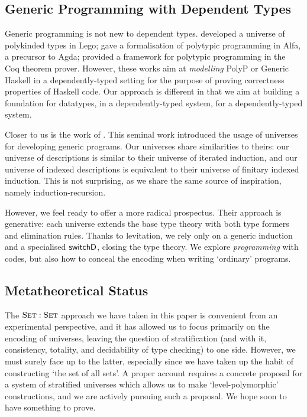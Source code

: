 \subsection{Generic Programming with Dependent Types}

Generic programming is not new to dependent
types. \citet{DBLP:conf/ifip2-1/AltenkirchM02} developed a universe
of polykinded types in Lego;
\citet{norell:msc-thesis} gave a formalisation of
polytypic programming in Alfa, a precursor to Agda;
\citet{verbruggen:polytype-prog-coq, verbruggen:polytype-coq} provided
a framework for polytypic programming in the Coq theorem
prover. However, these works aim at \emph{modelling} PolyP or Generic
Haskell in a dependently-typed setting for the purpose of proving
correctness properties of Haskell code. Our approach is different in
that we aim at building a foundation for datatypes, in a
dependently-typed system, for a dependently-typed system.

Closer to us is the work of \citet{benke:universe-generic-prog}. This
seminal work introduced the usage of universes for developing generic
programs. Our universes share similarities to theirs: our universe of
descriptions is similar to their universe of iterated induction, and
our universe of indexed descriptions is equivalent to their universe
of finitary indexed induction. This is not surprising, as we share the
same source of inspiration, namely induction-recursion.

However, we feel ready to offer a more radical prospectus. Their
approach is generative: each universe extends the base type theory
with both type formers and elimination rules. Thanks to levitation, we
rely only on a generic induction and a specialised $\SYMBswitchD$,
closing the type theory. We explore \emph{programming} with codes, but
also how to conceal the encoding when writing `ordinary' programs.


\subsection{Metatheoretical Status}

The \(\Set:\Set\) approach we have taken in this paper is convenient
from an experimental perspective, and it has allowed us to focus
primarily on the encoding of universes, leaving the question
of stratification (and with it, consistency, totality,
and decidability of type checking) to one side. However, we must
surely face up to the latter, especially since we have taken up the
habit of constructing `the set of all sets'. A proper account requires
a concrete proposal for a system of stratified universes which allows
us to make `level-polymorphic' constructions, and we are actively
pursuing such a proposal. We hope soon to have something to prove.

